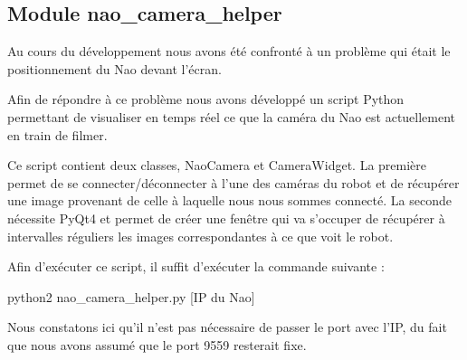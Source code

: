 \subsection{Module nao\_camera\_helper}
\label{sub:Module nao_camera_helper}
	\par Au cours du développement nous avons été confronté à un problème qui était
le positionnement du Nao devant l'écran.
	\par Afin de répondre à ce problème nous avons développé un
script 
Python permettant de visualiser en temps réel ce que la caméra du Nao est
actuellement en train de filmer.
	\par Ce script contient deux classes, NaoCamera et CameraWidget. La première
permet de se connecter/déconnecter à l'une des caméras du robot et de récupérer
une image provenant de celle à laquelle nous nous sommes connecté. La seconde
nécessite PyQt4 et permet de créer une fenêtre qui va s'occuper de récupérer à
intervalles réguliers les images correspondantes à ce que voit le robot.
	\par Afin d'exécuter ce script, il suffit d'exécuter la commande suivante :
	\begin{center}
		{python2 nao\_camera\_helper.py [IP du Nao]}
	\end{center}
	\par Nous constatons ici qu'il n'est pas nécessaire de passer le port avec l'IP,
du fait que nous avons assumé que le port 9559 resterait fixe.
